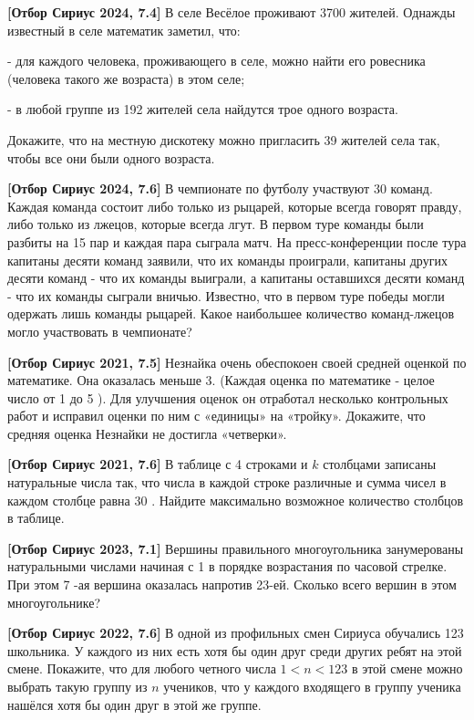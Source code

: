 \textbf{[Отбор Сириус 2024, 7.4]}
В селе Весёлое проживают 3700 жителей. Однажды известный в селе математик заметил, что:

- для каждого человека, проживающего в селе, можно найти его ровесника (человека такого же возраста) в этом селе;

- в любой группе из 192 жителей села найдутся трое одного возраста.

Докажите, что на местную дискотеку можно пригласить 39 жителей села так, чтобы все они были одного возраста.

\textbf{[Отбор Сириус 2024, 7.6]}
В чемпионате по футболу участвуют 30 команд. Каждая команда состоит либо только из рыцарей, которые всегда говорят правду, либо только из лжецов, которые всегда лгут. В первом туре команды были разбиты на 15 пар и каждая пара сыграла матч. На пресс-конференции после тура капитаны десяти команд заявили, что их команды проиграли, капитаны других десяти команд - что их команды выиграли, а капитаны оставшихся десяти команд - что их команды сыграли вничью. Известно, что в первом туре победы могли одержать лишь команды рыцарей. Какое наибольшее количество команд-лжецов могло участвовать в чемпионате?

\textbf{[Отбор Сириус 2021, 7.5]}
Незнайка очень обеспокоен своей средней оценкой по математике. Она оказалась меньше 3. (Каждая оценка по математике - целое число от 1 до 5 ). Для улучшения оценок он отработал несколько контрольных работ и исправил оценки по ним с «единицы» на «тройку». Докажите, что средняя оценка Незнайки не достигла «четверки».

\textbf{[Отбор Сириус 2021, 7.6]}
В таблице с 4 строками и $k$ столбцами записаны натуральные числа так, что числа в каждой строке различные и сумма чисел в каждом столбце равна 30 . Найдите максимально возможное количество столбцов в таблице.

\textbf{[Отбор Сириус 2023, 7.1]}
Вершины правильного многоугольника занумерованы натуральными числами начиная с 1 в порядке возрастания по часовой стрелке. При этом 7 -ая вершина оказалась напротив 23-ей. Сколько всего вершин в этом многоугольнике?

\newpage

\hspace{3mm}

\textbf{[Отбор Сириус 2022, 7.6]}
В одной из профильных смен Сириуса обучались 123 школьника. У каждого из них есть хотя бы один друг среди других ребят на этой смене. Покажите, что для любого четного числа $1<n<123$ в этой смене можно выбрать такую группу из $n$ учеников, что у каждого входящего в группу ученика нашёлся хотя бы один друг в этой же группе.
